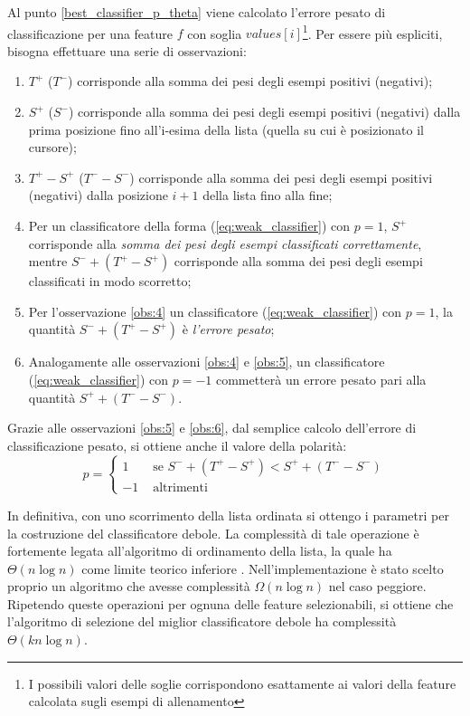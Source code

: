 Al punto \ref{best_classifier_p_theta} viene calcolato l'errore pesato di classificazione per una feature $f$ con soglia $values[i]$\footnote{I possibili valori delle soglie corrispondono esattamente ai valori della feature calcolata sugli esempi di allenamento}. Per essere più espliciti, bisogna effettuare una serie di osservazioni:
\begin{enumerate}
    \item \label{obs:1} $T^+$ ($T^-$) corrisponde alla somma dei pesi degli esempi positivi (negativi);
    \item \label{obs:2} $S^+$ ($S^-$) corrisponde alla somma dei pesi degli esempi positivi (negativi) dalla prima posizione fino all'i-esima della lista (quella su cui è posizionato il cursore);
    \item \label{obs:3} $T^+ - S^+$ ($T^- - S^-$) corrisponde alla somma dei pesi degli esempi positivi (negativi) dalla posizione $i+1$ della lista fino alla fine;
    \item \label{obs:4} Per un classificatore della forma (\ref{eq:weak_classifier}) con $p = 1$, $S^+$ corrisponde alla \emph{somma dei pesi degli esempi classificati correttamente}, mentre $S^- + (T^+ - S^+)$ corrisponde alla somma dei pesi degli esempi classificati in modo scorretto;
    \item \label{obs:5} Per l'osservazione \ref{obs:4} un classificatore (\ref{eq:weak_classifier}) con $p = 1$, la quantità $S^- + (T^+ - S^+)$ è \emph{l'errore pesato};
    \item \label{obs:6} Analogamente alle osservazioni \ref{obs:4} e \ref{obs:5}, un classificatore (\ref{eq:weak_classifier}) con $p = -1$ commetterà un errore pesato pari alla quantità $S^+ + (T^- - S^-)$.
\end{enumerate}

Grazie alle osservazioni \ref{obs:5} e \ref{obs:6}, dal semplice calcolo dell'errore di classificazione pesato, si ottiene anche il valore della polarità:
\begin{equation}
    p = \begin{cases}
    1 & \text{ se } S^- + (T^+ - S^+) < S^+ + (T^- - S^-) \\
    -1 & \text{ altrimenti }
\end{cases}
\end{equation}

In definitiva, con uno scorrimento della lista ordinata si ottengo i parametri per la costruzione del classificatore debole. La complessità di tale operazione è fortemente legata all'algoritmo di ordinamento della lista, la quale ha $\Theta(n\log n)$ come limite teorico inferiore \cite[p. 167]{Cormen09}. Nell'implementazione è stato scelto proprio un algoritmo che avesse complessità $\Omega(n\log n)$ nel caso peggiore. Ripetendo queste operazioni per ognuna delle feature selezionabili, si ottiene che l'algoritmo di selezione del miglior classificatore debole ha complessità $\Theta(kn\log n)$.


